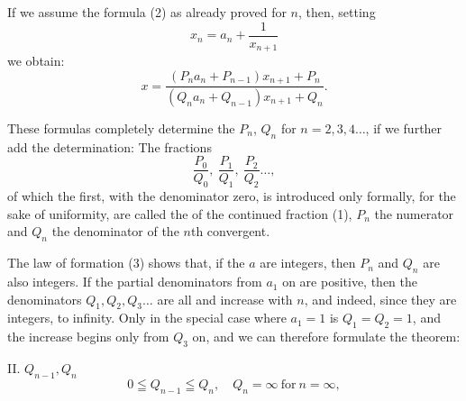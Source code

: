 
If we assume the formula (2) as already proved for $n$, then, setting
\[
x_n = a_n + \frac{1}{x_{n+1}}
\]
we obtain:
\[
x = \frac{(P_n a_n + P_{n-1}) x_{n+1} + P_n}{(Q_n a_n + Q_{n-1}) x_{n+1} + Q_n}.
\]

These formulas completely determine the $P_n$, $Q_n$ for $n = 2, 3, 4 \ldots$, if we further add the determination:
The fractions
\[
\frac{P_0}{Q_0}, \ \frac{P_1}{Q_1}, \ \frac{P_2}{Q_2} \ldots,
\]
of which the first, with the denominator zero, is introduced only formally, for the sake of uniformity, are called the  of the continued fraction (1), $P_n$ the numerator and $Q_n$ the denominator of the $n$th convergent.

The law of formation (3) shows that, if the $a$ are integers, then $P_n$ and $Q_n$ are also integers. If the partial denominators from $a_1$ on are positive, then the denominators $Q_1, Q_2, Q_3 \ldots$ are all  and increase with $n$, and indeed, since they are integers, to infinity. Only in the special case where $a_1 = 1$ is $Q_1 = Q_2 = 1$, and the increase begins only from $Q_3$ on, and we can therefore formulate the theorem:

II.  $Q_{n-1}, Q_n$ 
\[
0 \leqq Q_{n-1} \leqq Q_n, \quad Q_n = \infty \ \text{for} \ n = \infty,
\]
